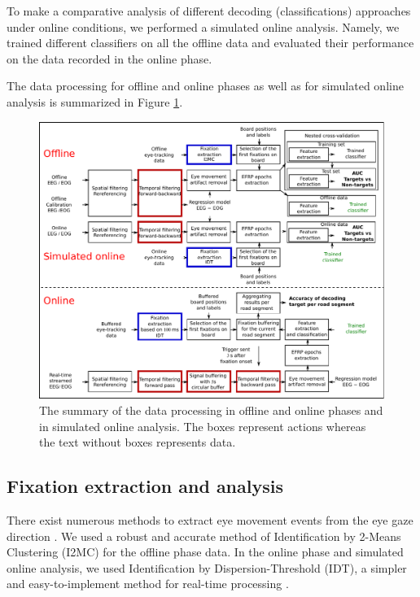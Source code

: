 \documentclass[12pt]{iopart}
\begin{document}
To make a comparative analysis of different decoding (classifications) approaches under online conditions, we performed a simulated online analysis. Namely, we trained different classifiers on all the offline data and evaluated their performance on the data recorded in the online phase. 

The data processing for offline and online phases as well as for simulated online analysis is 
summarized in Figure \ref{fig:flowchart}.


\begin{figure}[!t]
    \centering
    \includegraphics[trim={0cm 0cm 0cm 0cm},clip,width=\textwidth]{../images/DataProcessing3.pdf}
    \caption{The summary of the data processing in offline and online phases and in simulated online
    analysis. The boxes represent actions whereas the text without boxes represents data.}
\label{fig:flowchart}
\end{figure}



\subsection{Fixation extraction and analysis}
There exist numerous methods to extract eye movement events
from the eye gaze direction \cite{zhang_novel_2015,pena_detecting_2019}.
We used a robust and accurate method of 
Identification by 2-Means Clustering (I2MC)
\cite{hessels_noise-robust_2017}
for the offline phase data.
In the online phase and simulated online analysis,
we used Identification by Dispersion-Threshold (IDT), a simpler and
easy-to-implement method for real-time processing \cite{salvucci_identifying_2000}.
\end{document}
